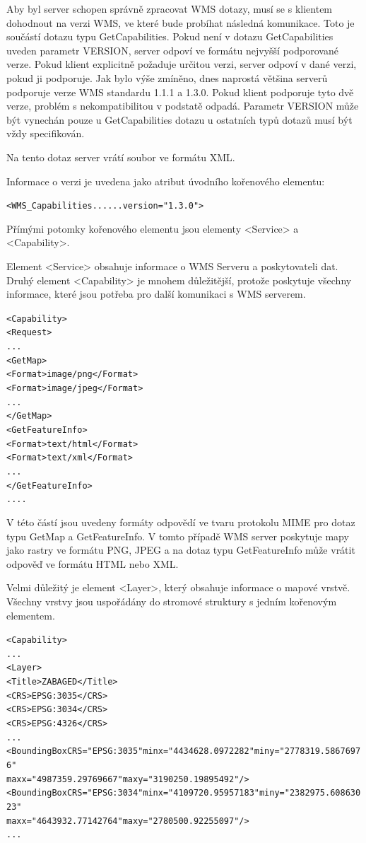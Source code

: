 \documentclass[a4paper,12pt]{article}
\begin{document}
Aby byl server schopen správně zpracovat WMS dotazy, musí se s
klientem dohodnout na verzi WMS, ve které bude probíhat následná
komunikace.  Toto je součástí dotazu typu GetCapabilities. Pokud není
v dotazu GetCapabilities uveden parametr VERSION, server odpoví ve
formátu nejvyšší podporované verze.  Pokud klient explicitně požaduje
určitou verzi, server odpoví v dané verzi, pokud ji podporuje. Jak
bylo výše zmíněno, dnes naprostá většina serverů podporuje verze WMS
standardu 1.1.1 a 1.3.0. Pokud klient podporuje tyto dvě verze,
problém s nekompatibilitou v podstatě odpadá. Parametr VERSION může
být vynechán pouze u GetCapabilities dotazu u ostatních typů dotazů
musí být vždy specifikován.

Na tento dotaz server vrátí soubor ve formátu XML.

Informace o verzi je uvedena jako atribut úvodního kořenového
elementu:
\begin{alltt}\footnotesize
<WMS_Capabilities...    ...version="1.3.0">
\end{alltt}

Přímými potomky kořenového elementu jsou elementy <Service> a
<Capability>.

Element <Service> obsahuje informace o WMS Serveru a poskytovateli
dat.  Druhý element <Capability> je mnohem důležitější, protože
poskytuje všechny informace, které jsou potřeba pro další komunikaci s
WMS serverem.

\begin{alltt}\footnotesize
<Capability>
    <Request>
          ...
       <GetMap>
            <Format>image/png</Format>
            <Format>image/jpeg</Format>
          ...
       </GetMap>	
       <GetFeatureInfo>
            <Format>text/html</Format>
            <Format>text/xml</Format>
              ...
       </GetFeatureInfo>
           ....
\end{alltt}
V této částí jsou uvedeny formáty odpovědí ve tvaru protokolu MIME pro
dotaz typu GetMap a GetFeatureInfo. V tomto případě WMS server
poskytuje mapy jako rastry ve formátu PNG, JPEG a na dotaz typu
GetFeatureInfo může vrátit odpověď ve formátu HTML nebo XML.

Velmi důležitý je element <Layer>, který obsahuje informace o mapové
vrstvě. Všechny vrstvy jsou uspořádány do stromové struktury s jedním
kořenovým elementem.

\begin{alltt}\footnotesize
<Capability>
    ...
  <Layer>
   <Title>ZABAGED</Title>
     <CRS>EPSG:3035</CRS>
     <CRS>EPSG:3034</CRS>
     <CRS>EPSG:4326</CRS>
      ...
     <BoundingBox CRS="EPSG:3035" minx="4434628.0972282" miny="2778319.58676976"
                                  maxx="4987359.29769667" maxy="3190250.19895492"/>
     <BoundingBox CRS="EPSG:3034" minx="4109720.95957183" miny="2382975.60863023"
                                  maxx="4643932.77142764" maxy="2780500.92255097"/>
      ...
\end{alltt}
\end{document}
